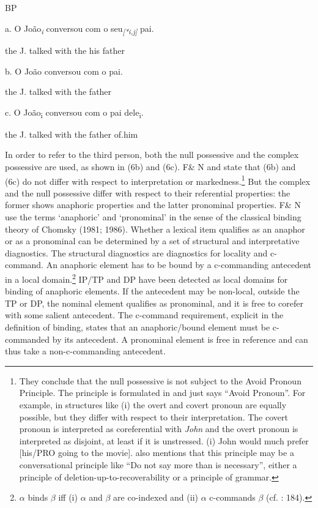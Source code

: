 \documentclass[output=paper]{langsci/langscibook}
\begin{document}
\ea%
    \label{ex:key:6}
    \gll\\
        \\
    \glt
    \z

          BP

  a.  O João\textit{\textsubscript{i}} conversou com o   seu\textit{\textsubscript{[*i,j]}} pai.

the J.   talked   with the his   father

  b.  O João conversou com o pai.

the J. talked with the father

c.  O João\textsubscript{i} conversou com o pai dele\textsubscript{i}.

the J.   talked with the father of.him

In order to refer to the third person, both the null possessive and the complex possessive are used, as shown in (6b) and (6c). F\& N and \citet{Rodrigues2010} state that (6b) and (6c) do not differ with respect to interpretation or markedness.\footnote{They conclude that the null possessive is not subject to the Avoid Pronoun Principle. The principle is formulated in \citet{Chomsky1981} and just says “Avoid Pronoun”. For example, in structures like (i) the overt and covert pronoun are equally possible, but they differ with respect to their interpretation. The covert pronoun is interpreted as coreferential with \textit{John} and the overt pronoun is interpreted as disjoint, at least if it is unstressed. (i) John would much prefer [his/PRO going to the movie]. \citep[65]{Chomsky1981}\citet[65]{Chomsky1981} also mentions that this principle may be a conversational principle like “Do not say more than is necessary”, either a principle of deletion-up-to-recoverability or a principle of grammar.} But the complex and the null possessive differ with respect to their referential properties: the former shows anaphoric properties and the latter pronominal properties. F\& N use the terms ‘anaphoric’ and ‘pronominal’ in the sense of the classical binding theory of Chomsky (1981; 1986). Whether a lexical item qualifies as an anaphor or as a pronominal can be determined by a set of structural and interpretative diagnostics. The structural diagnostics are diagnostics for locality and c-command. An anaphoric element has to be bound by a c-commanding antecedent in a local domain.\footnote{$\alpha $ binds $\beta $ iff (i) $\alpha $ and $\beta $ are co-indexed and (ii) $\alpha $ c-commands $\beta $ (cf. \citealt{Chomsky1981}: 184).} IP/TP and DP have been detected as local domains for binding of anaphoric elements. If the antecedent may be non-local, outside the TP or DP, the nominal element qualifies as pronominal, and it is free to corefer with some salient antecedent. The c-command requirement, explicit in the definition of binding, states that an anaphoric/bound element must be c-commanded by its antecedent. A pronominal element is free in reference and can thus take a non-c-commanding antecedent.
\end{document}
